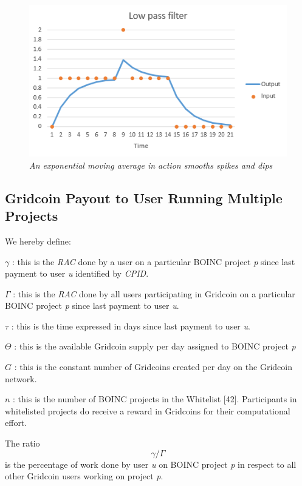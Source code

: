 \begin{figure}
\centering
\includegraphics{figures/low-pass}
\caption{\textit{An exponential moving average in action smooths spikes and dips}}
\small
\end{figure}

\subsection{Gridcoin Payout to User Running Multiple Projects}

We hereby define:
\begin{description}
  \item{$\gamma$} : this is the \textit{RAC} done by a user on a particular BOINC project \textit{p} since last payment to user \textit{u} identified by \textit{CPID}.
  \item{$\Gamma$} : this is the \textit{RAC} done by all users participating in Gridcoin on a particular BOINC project \textit{p} since last payment to user \textit{u}.
  \item{$\tau$} : this is the time expressed in days since last payment to user \textit{u}.
  \item{$\Theta$} : this is the available Gridcoin supply per day assigned to BOINC project \textit{p}
  \item{$G$} : this is the constant number of Gridcoins created per day on the Gridcoin network. 
  \item{$n$} : this is the number of BOINC projects in the Whitelist [42]. Participants in whitelisted projects do receive a reward in Gridcoins for their computational effort.  
\end{description}

The ratio
\[\gamma/\Gamma\]
is the percentage of work done by user \textit{u} on BOINC project \textit{p} in respect to all other Gridcoin users working on project \textit{p}.\\

